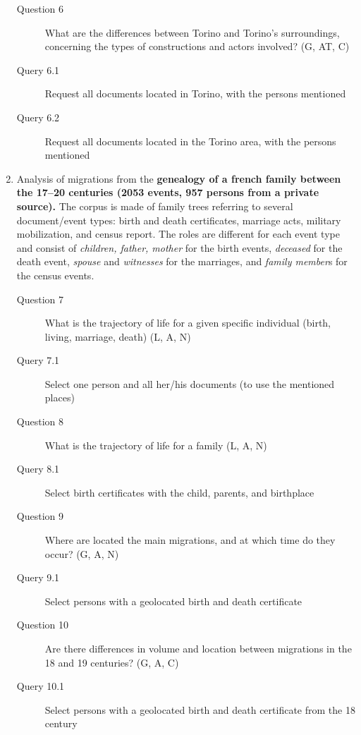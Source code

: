 \begin{enumerate}
\begin{footnotesize}
\begin{description}
    \item[Question 6] What are the differences between Torino and Torino's surroundings, concerning the types of constructions and actors involved? (G, AT, C)
    \item[\myindent Query 6.1] Request all documents located in Torino, with the persons mentioned
    \item[\myindent Query 6.2] Request all documents located in the Torino area, with the persons mentioned
    \end{description}
    \end{footnotesize}

    \item Analysis of migrations from the \textbf{genealogy of a french family between the 17--20 centuries (2053 events, 957 persons from a private source).}
    The corpus is made of family trees referring to several document/event types: birth and death certificates, marriage acts, military mobilization, and census report. The roles are different for each event type and consist of \textit{children, father, mother} for the birth events, \textit{deceased} for the death event, \textit{spouse} and \textit{witnesses} for the marriages, and \textit{family member}s for the census events.
    \begin{footnotesize}
    \begin{description}
    \item[Question 7] What is the trajectory of life for a given specific individual (birth, living, marriage, death) (L, A, N)
    \item[\myindent Query 7.1] Select one person and all her/his documents (to use the mentioned places)
    \item[Question 8] What is the trajectory of life for a family (L, A, N)
    \item[\myindent Query 8.1] Select birth certificates with the child, parents, and birthplace
    \item[Question 9] Where are located the main migrations, and at which time do they occur? (G, A, N)
    \item[\myindent Query 9.1] Select persons with a geolocated birth and death certificate
    \item[Question 10] Are there differences in volume and location between migrations in the 18 and 19 centuries? (G, A, C)
    \item[\myindent Query 10.1] Select persons with a geolocated birth and death certificate from the 18 century

\end{description}
\end{footnotesize}
\end{enumerate}
